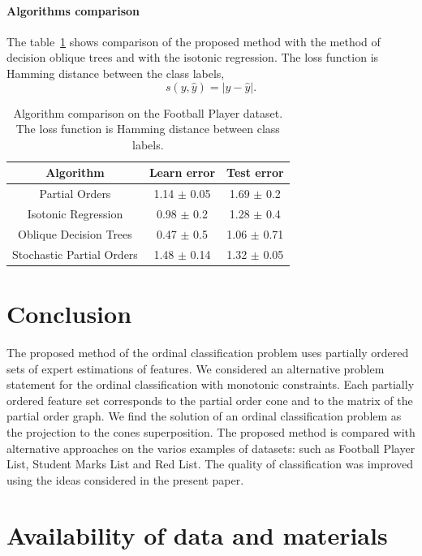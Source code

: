 \documentclass[12pt,preprint]{elsarticle}
\begin{document}
\paragraph{Algorithms comparison}
The table~\ref{tab:AlgComparison} shows comparison of the proposed method with the method of decision oblique trees and with the isotonic regression. The loss function is Hamming distance between the class labels,
\[
s(y,\hat{y})=|y-\hat{y}|.
\]

\begin{table}[h]
\centering
\caption{Algorithm comparison on the Football Player dataset. The loss function is Hamming distance between class labels.}
\begin{tabular}{|c|cc|}
  \hline
  Algorithm & Learn error & Test error \\
  \hline
  Partial Orders & 1.14 $\pm$ 0.05 & 1.69 $\pm$ 0.2 \\
  \hline
  Isotonic Regression & 0.98 $\pm$ 0.2 & 1.28 $\pm$ 0.4 \\
  \hline
  Oblique Decision Trees & 0.47 $\pm$ 0.5 & 1.06 $\pm$ 0.71 \\
  \hline
  Stochastic Partial Orders & 1.48 $\pm$ 0.14 & 1.32 $\pm$ 0.05 \\
  \hline
\end{tabular}
\label{tab:AlgComparison}
\end{table}

\section{Conclusion}
The proposed method of the ordinal classification problem uses partially ordered sets of expert estimations of features. We considered an alternative problem statement for the ordinal classification with monotonic constraints. Each partially ordered feature set corresponds to the partial order cone and to the matrix of the partial order graph. We find the solution of an ordinal classification problem as the projection to the cones superposition. The proposed method is compared with alternative approaches on the varios examples of datasets: such as Football Player List, Student Marks List and Red List. The quality of classification was improved using the ideas considered in the present paper.

\section{Availability of data and materials}
\end{document}
